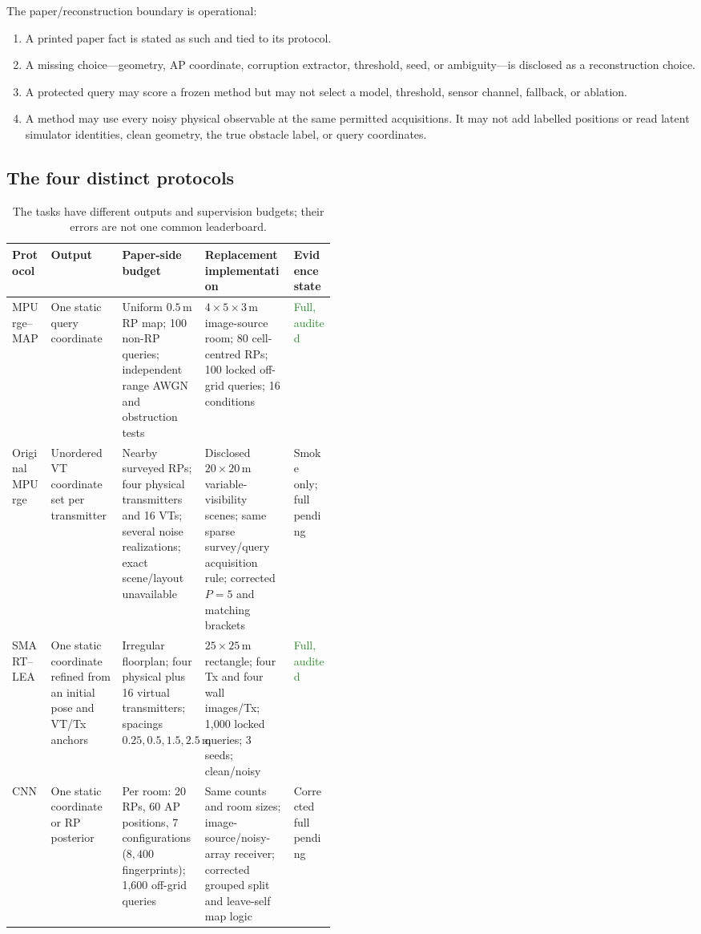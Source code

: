 \documentclass[10pt]{article}
\newcommand{\m}{\,\mathrm m}
\newcommand{\good}[1]{\textcolor{ForestGreen}{#1}}
\newcommand{\caution}[1]{\textcolor{BrickRed}{#1}}
\begin{document}
The paper/reconstruction boundary is operational:
\begin{enumerate}
\item A printed paper fact is stated as such and tied to its protocol.
\item A missing choice---geometry, AP coordinate, corruption extractor,
threshold, seed, or ambiguity---is disclosed as a reconstruction choice.
\item A protected query may score a frozen method but may not select a model,
threshold, sensor channel, fallback, or ablation.
\item A method may use every noisy physical observable at the same permitted
acquisitions.  It may not add labelled positions or read latent simulator
identities, clean geometry, the true obstacle label, or query coordinates.
\end{enumerate}

\subsection{The four distinct protocols}

\begin{table}[ht]
\centering\small
\begin{tabularx}{\linewidth}{@{}p{0.12\linewidth}p{0.22\linewidth}YYp{0.13\linewidth}@{}}
\toprule
Protocol & Output & Paper-side budget & Replacement implementation & Evidence state\\
\midrule
MPUrge--MAP & One static query coordinate & Uniform $0.5\m$ RP map; 100 non-RP queries; independent range AWGN and obstruction tests & $4\times5\times3\m$ image-source room; 80 cell-centred RPs; 100 locked off-grid queries; 16 conditions & \good{Full, audited}\\
Original MPUrge & Unordered VT coordinate set per transmitter & Nearby surveyed RPs; four physical transmitters and 16 VTs; several noise realizations; exact scene/layout unavailable & Disclosed $20\times20\m$ variable-visibility scenes; same sparse survey/query acquisition rule; corrected $P=5$ and matching brackets & \caution{Smoke only; full pending}\\
SMART--LEA & One static coordinate refined from an initial pose and VT/Tx anchors & Irregular floorplan; four physical plus 16 virtual transmitters; spacings $0.25,0.5,1.5,2.5\m$ & $25\times25\m$ rectangle; four Tx and four wall images/Tx; 1,000 locked queries; 3 seeds; clean/noisy & \good{Full, audited}\\
CNN & One static coordinate or RP posterior & Per room: 20 RPs, 60 AP positions, 7 configurations ($8{,}400$ fingerprints); 1,600 off-grid queries & Same counts and room sizes; image-source/noisy-array receiver; corrected grouped split and leave-self map logic & \caution{Corrected full pending}\\
\bottomrule
\end{tabularx}
\caption{The tasks have different outputs and supervision budgets; their errors are not one common leaderboard.}
\end{table}
\end{document}
